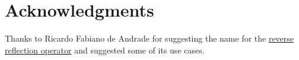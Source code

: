 \section{Acknowledgments}

Thanks to Ricardo Fabiano de Andrade for suggesting the name \verb@unreflexpr@ for
the \hyperref[fut-reverse-reflection]{reverse reflection operator} and
suggested some of its use cases.
